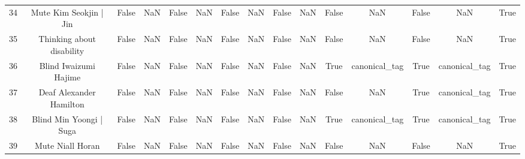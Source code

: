 \begin{table}[h!]
{\begin{tabular}{|c|c|c|c|c|c|c|c|c|c|c|c|c|c|c|}
         34 &                            Mute Kim Seokjin | Jin &                          False &                       NaN &                          False &                       NaN &                          False &                       NaN &                          False &                       NaN &                          False &                       NaN &                          False &                       NaN &                           True \\
         35 &                         Thinking about disability &                          False &                       NaN &                          False &                       NaN &                          False &                       NaN &                          False &                       NaN &                          False &                       NaN &                          False &                       NaN &                           True \\
         36 &                             Blind Iwaizumi Hajime &                          False &                       NaN &                          False &                       NaN &                          False &                       NaN &                          False &                       NaN &                           True &             canonical\_tag &                           True &             canonical\_tag &                           True \\
         37 &                           Deaf Alexander Hamilton &                          False &                       NaN &                          False &                       NaN &                          False &                       NaN &                          False &                       NaN &                          False &                       NaN &                           True &             canonical\_tag &                           True \\
         38 &                           Blind Min Yoongi | Suga &                          False &                       NaN &                          False &                       NaN &                          False &                       NaN &                          False &                       NaN &                           True &             canonical\_tag &                           True &             canonical\_tag &                           True \\
         39 &                                  Mute Niall Horan &                          False &                       NaN &                          False &                       NaN &                          False &                       NaN &                          False &                       NaN &                          False &                       NaN &                          False &                       NaN &                           True \\

\end{tabular}}
\end{table}
